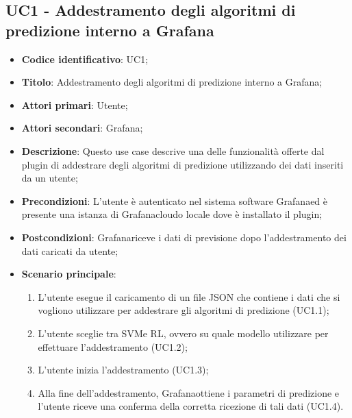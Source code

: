 	\subsection{UC1 - Addestramento degli algoritmi di predizione interno a Grafana}
	\begin{itemize}
		\item \textbf{Codice identificativo}: UC1;
		\item \textbf{Titolo}: Addestramento degli algoritmi di predizione interno a Grafana\glo;
		\item \textbf{Attori primari}: Utente;
		\item \textbf{Attori secondari}: Grafana\glo;
		\item \textbf{Descrizione}: Questo use case descrive una delle funzionalità offerte dal plugin di addestrare degli algoritmi di predizione utilizzando dei dati inseriti da un utente;
		\item \textbf{Precondizioni}: L'utente è autenticato nel sistema software Grafana\glosp ed è presente una istanza di Grafana\glosp cloud\glosp o locale dove è installato il plugin;
		\item \textbf{Postcondizioni}: Grafana\glosp riceve i dati di previsione dopo l'addestramento dei dati caricati da utente;
		\item \textbf{Scenario principale}: 
			\begin{enumerate}
				\item L'utente esegue il caricamento di un file JSON che contiene i dati che si vogliono utilizzare per addestrare gli algoritmi di predizione (UC1.1);
				\item L'utente sceglie tra SVM\glosp e RL\glo, ovvero su quale modello utilizzare per effettuare l'addestramento (UC1.2);
				\item L'utente inizia l'addestramento (UC1.3);
				\item Alla fine dell'addestramento, Grafana\glosp ottiene i parametri di predizione e l'utente riceve una conferma della corretta ricezione di tali dati (UC1.4).
			\end{enumerate}
	\end{itemize}

